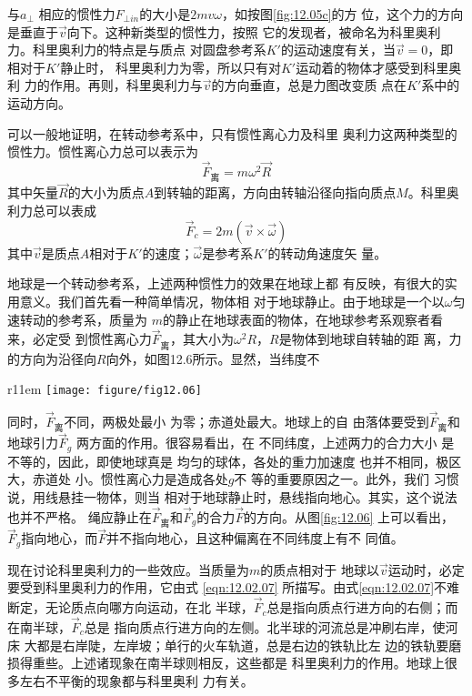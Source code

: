 \documentclass[../outline-of-mechanics.tex]{subfiles}
\begin{document}
与$ a _ { \bot } $ 相应的惯性力$ F_{\bot in} $的大小是$ 2mv\omega $，如按图\ref{fig:12.05c}的方
位，这个力的方向是垂直于$\vec{v}$向下。这种新类型的惯性力，按照
它的发现者，被命名为科里奥利力。科里奥利力的特点是与质点
对圆盘参考系$ K' $的运动速度有关，当$ \vec{v} = 0 $，即相对于$ K' $静止时，
科里奥利力为零，所以只有对$ K' $运动着的物体才感受到科里奥利
力的作用。再则，科里奥利力与$\vec{v}$的方向垂直，总是力图改变质
点在$ K' $系中的运动方向。

可以一般地证明，在转动参考系中，只有惯性离心力及科里
奥利力这两种类型的惯性力。惯性离心力总可以表示为
\begin{equation}\label{eqn:12.02.06}
  \vec{F} _ \text{离} = m \omega ^ { 2 } \vec{R}
\end{equation}
其中矢量$\vec{R}$的大小为质点$ A $到转轴的距离，方向由转轴沿径向指向质点$ M $。科里奥利力总可以表成
\begin{equation}\label{eqn:12.02.07}
  \vec{F} _ { c } = 2 m \left( \vec{v} \times \vec{\omega} \right)
\end{equation}
其中$\vec{v}$是质点$ A $相对于$ K' $的速度；$\vec{\omega}$是参考系$ K' $的转动角速度矢
量。

地球是一个转动参考系，上述两种惯性力的效果在地球上都
有反映，有很大的实用意义。我们首先看一种简单情况，物体相
对于地球静止。由于地球是一个以$ \omega $匀速转动的参考系，质量为
$ m $的静止在地球表面的物体，在地球参考系观察者看来，必定受
到惯性离心力$ \vec{F}_\text{离} $，其大小为$ \omega ^ { 2 } R $，$ R $是物体到地球自转轴的距
离，力的方向为沿径向$ R $向外，如图12.6所示。显然，当纬度不
\begin{wrapfigure}[11]{r}{11em}
  \centering
  \texttt{[image: figure/fig12.06]}
  \caption{地球上物体所受到的惯性离心力}
  \label{fig:12.06}
\end{wrapfigure}
同时，$ \vec{F}_\text{离} $不同，两极处最小
为零；赤道处最大。地球上的自
由落体要受到$ \vec{F}_\text{离} $和地球引力$ \vec{F}_g $
两方面的作用。很容易看出，在
不同纬度，上述两力的合力大小
是不等的，因此，即使地球真是
均匀的球体，各处的重力加速度
也并不相同，极区大，赤道处
小。惯性离心力是造成各处$ g $不
等的重要原因之一。此外，我们
习惯说，用线悬挂一物体，则当
相对于地球静止时，悬线指向地心。其实，这个说法也并不严格。
绳应静止在$ \vec{F}_\text{离} $和$ \vec{F}_g $的合力$ \vec{F} $的方向。从图\ref{fig:12.06} 上可以看出，
$ \vec{F}_g $指向地心，而$ \vec{F} $并不指向地心，且这种偏离在不同纬度上有不
同值。

现在讨论科里奥利力的一些效应。当质量为$ m $的质点相对于
地球以$\vec{v}$运动时，必定要受到科里奥利力的作用，它由式 \eqref{eqn:12.02.07}
所描写。由式\eqref{eqn:12.02.07}不难断定，无论质点向哪方向运动，在北
半球，$ \vec{F}_c $总是指向质点行进方向的右侧；而在南半球，$ \vec{F}_c $总是
指向质点行进方向的左侧。北半球的河流总是冲刷右岸，使河床
大都是右岸陡，左岸坡；单行的火车轨道，总是右边的铁轨比左
边的铁轨要磨损得重些。上述诸现象在南半球则相反，这些都是
科里奥利力的作用。地球上很多左右不平衡的现象都与科里奥利
力有关。
\end{document}
